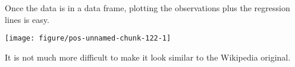 \documentclass[paper=a4,headsepline,BCOR=12mm,twoside,open=right,%
titlepage,headings=small,fontsize=10pt,index=totoc,bibliography=totoc,%
captions=tableheading,captions=nooneline]{scrbook}\usepackage{knitr}
\begin{document}
\begin{knitrout}\footnotesize
{}\color{fgcolor}\begin{kframe}
\begin{alltt}
 \hlkwb{<-} \hlstd{(} \hlstd{=}\hlstd{)}
 \hlkwb{<-} \hlstd{(} \hlstd{= my.mat[ ,} \hlstd{],}
                           \hlstd{= my.mat[ ,} \hlstd{],}
                          \hlstd{=}\hlstd{(}\hlstd{(}\hlopt{:}\hlstd{,} \hlstd{(}\hlstd{,}\hlstd{))))}
\end{alltt}
\end{kframe}
\end{knitrout}

Once the data is in a data frame, plotting the observations plus the regression lines is easy.

\begin{knitrout}\footnotesize
{}\color{fgcolor}\begin{kframe}
\begin{alltt}
  \hlopt{+}
  \hlstd{()} \hlopt{+}
  \hlstd{(}\hlstd{=}\hlstd{)} \hlopt{+}
  \hlstd{(}\hlopt{~} \hlstd{=}\hlstd{)}
\end{alltt}
\end{kframe}

{\centering \texttt{[image: figure/pos-unnamed-chunk-122-1]} 

}



\end{knitrout}

It is not much more difficult to make it look similar to the Wikipedia original.
\end{document}
